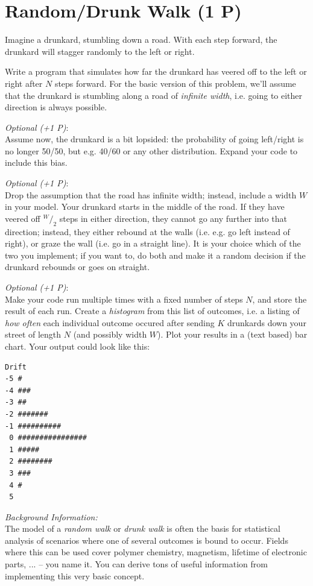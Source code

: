 \documentclass[
	english,
	fontsize=10pt,
	parskip=half,
	titlepage=true,
	DIV=12
]{scrartcl}
\newcommand*{\ie}{i.\;e. }
\newcommand*{\eg}{e.\;g. }
\begin{document}
\section{Random/Drunk Walk (1 P)}
Imagine a drunkard, stumbling down a road. With each step forward, the drunkard will stagger randomly to the left or right.

Write a program that simulates how far the drunkard has veered off to the left or right after $N$ steps forward. For the basic version of this problem, we'll assume that the drunkard is stumbling along a road of \emph{infinite width}, \ie going to either direction is always possible.

\emph{Optional (+1 P)}:\\
Assume now, the drunkard is a bit lopsided: the probability of going left/right is no longer 50/50, but \eg 40/60 or any other distribution. Expand your code to include this bias.

\emph{Optional (+1 P)}:\\
Drop the assumption that the road has infinite width; instead, include a width $W$ in your model. Your drunkard starts in the middle of the road. If they have veered off $^{W}/_{2}$ steps in either direction, they cannot go any further into that direction; instead, they either rebound at the walls (\ie \eg go left instead of right), or graze the wall (\ie go in a straight line). It is your choice which of the two you implement; if you want to, do both and make it a random decision if the drunkard rebounds or goes on straight.

\emph{Optional (+1 P)}:\\
Make your code run multiple times with a fixed number of steps $N$, and store the result of each run. Create a \emph{histogram} from this list of outcomes, \ie a listing of \emph{how often} each individual outcome occured after sending $K$ drunkards down your street of length $N$ (and possibly width $W$). Plot your results in a (text based) bar chart. Your output could look like this:
\begin{verbatim}
Drift
-5 #
-4 ###
-3 ##
-2 #######
-1 ##########
 0 ################
 1 #####
 2 ########
 3 ###
 4 #
 5
\end{verbatim}

\emph{Background Information:}\\
The model of a \emph{random walk} or \emph{drunk walk} is often the basis for statistical analysis of scenarios where one of several outcomes is bound to occur. Fields where this can be used cover polymer chemistry, magnetism, lifetime of electronic parts, ... -- you name it. You can derive tons of useful information from implementing this very basic concept.
\end{document}
